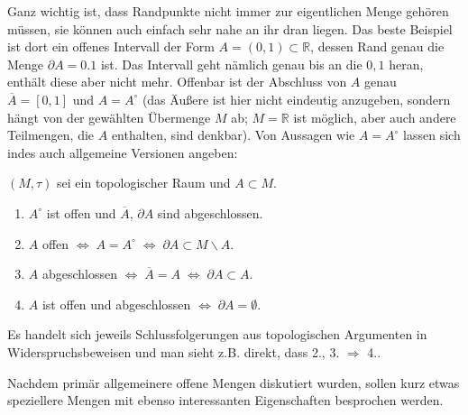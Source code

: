 \documentclass[../H_Analysis_main.tex]{subfiles}
\begin{document}
Ganz wichtig ist, dass Randpunkte nicht immer zur eigentlichen Menge gehören müssen, sie können auch einfach sehr nahe an ihr dran liegen. Das beste Beispiel ist dort ein offenes Intervall der Form $A = (0, 1) \subset \mathbb{R}$, dessen Rand genau die Menge $\partial A = \qty{0, 1}$ ist. Das Intervall geht nämlich genau bis an die $0, 1$ heran, enthält diese aber nicht mehr. Offenbar ist der Abschluss von $A$ genau $\overline{A} = [0, 1]$ und $A = A^\circ$ (das Äußere ist hier nicht eindeutig anzugeben, sondern hängt von der gewählten Übermenge $M$ ab; $M = \mathbb{R}$ ist möglich, aber auch andere Teilmengen, die $A$ enthalten, sind denkbar). Von Aussagen wie $A = A^\circ$ lassen sich indes auch allgemeine Versionen angeben: %
\begin{cor}
$(M, \tau)$ sei ein topologischer Raum und $A \subset M$.

\begin{enumerate}
\item $A^\circ$ ist offen und $\overline{A}, \, \partial A$ sind abgeschlossen.



\item $A$ offen $\Leftrightarrow \; A = A^\circ \; \Leftrightarrow \; \partial A \subset M \backslash A$.

\item $A$ abgeschlossen $\Leftrightarrow \; \overline{A} = A \; \Leftrightarrow \; \partial A \subset A$.

\item $A$ ist offen und abgeschlossen $\Leftrightarrow \; \partial A = \emptyset$.
\end{enumerate}
\end{cor}
Es handelt sich jeweils Schlussfolgerungen aus topologischen Argumenten in Widerspruchsbeweisen und man sieht z.B. direkt, dass 2., 3. $\Rightarrow$ 4..



Nachdem primär allgemeinere offene Mengen diskutiert wurden, sollen kurz etwas speziellere Mengen mit ebenso interessanten Eigenschaften besprochen werden.
\end{document}
